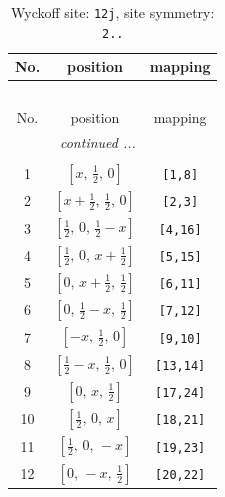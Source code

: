 \documentclass[fleqn,8pt]{jsarticle}
\begin{document}
\begin{longtable}{ccc}
\caption{Wyckoff site: {\tt 12j}, site symmetry: {\tt 2..}}
 \\
 \hline \hline
No. & position & mapping \\ \hline \endfirsthead

\multicolumn{2}{l}{\tablename\ \thetable{}} \\
 \hline \hline
No. & position & mapping \\ \hline \endhead

 \hline \hline
\multicolumn{2}{r}{\footnotesize\it continued ...} \\ \endfoot

 \hline \hline
\multicolumn{2}{r}{} \\ \endlastfoot

1 & $\left[ x,\, \frac{1}{2},\, 0 \right]$ & {\tt [1,8]} \\ \hline
2 & $\left[ x + \frac{1}{2},\, \frac{1}{2},\, 0 \right]$ & {\tt [2,3]} \\ \hline
3 & $\left[ \frac{1}{2},\, 0,\, \frac{1}{2} - x \right]$ & {\tt [4,16]} \\ \hline
4 & $\left[ \frac{1}{2},\, 0,\, x + \frac{1}{2} \right]$ & {\tt [5,15]} \\ \hline
5 & $\left[ 0,\, x + \frac{1}{2},\, \frac{1}{2} \right]$ & {\tt [6,11]} \\ \hline
6 & $\left[ 0,\, \frac{1}{2} - x,\, \frac{1}{2} \right]$ & {\tt [7,12]} \\ \hline
7 & $\left[ - x,\, \frac{1}{2},\, 0 \right]$ & {\tt [9,10]} \\ \hline
8 & $\left[ \frac{1}{2} - x,\, \frac{1}{2},\, 0 \right]$ & {\tt [13,14]} \\ \hline
9 & $\left[ 0,\, x,\, \frac{1}{2} \right]$ & {\tt [17,24]} \\ \hline
10 & $\left[ \frac{1}{2},\, 0,\, x \right]$ & {\tt [18,21]} \\ \hline
11 & $\left[ \frac{1}{2},\, 0,\, - x \right]$ & {\tt [19,23]} \\ \hline
12 & $\left[ 0,\, - x,\, \frac{1}{2} \right]$ & {\tt [20,22]} \\
\end{longtable}
\renewcommand{\arraystretch}{1.2}
\end{document}
